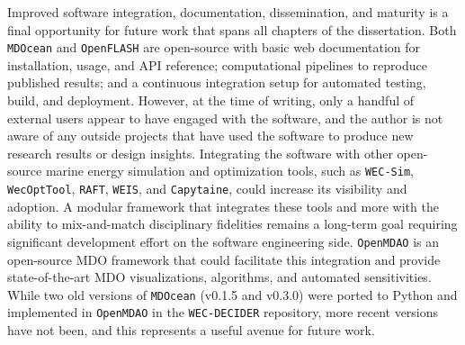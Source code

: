 Improved software integration, documentation, dissemination, and maturity is a final opportunity for future work that spans all chapters of the dissertation.
Both \texttt{MDOcean} and \texttt{OpenFLASH} are open-source with basic web documentation for installation, usage, and API reference;
computational pipelines to reproduce published results;
and a continuous integration setup for automated testing, build, and deployment.
However, at the time of writing, only a handful of external users appear to have engaged with the software,
and the author is not aware of any outside projects that have used the software to produce new research results or design insights.
Integrating the software with other open-source marine energy simulation and optimization tools,
such as \texttt{WEC-Sim}, \texttt{WecOptTool}, \texttt{RAFT}, \texttt{WEIS}, and \texttt{Capytaine},
could increase its visibility and adoption.
A modular framework that integrates these tools and more with the ability to mix-and-match disciplinary fidelities remains a long-term goal requiring significant development effort on the software engineering side.
\texttt{OpenMDAO} is an open-source MDO framework that could facilitate this integration and provide state-of-the-art MDO visualizations, algorithms, and automated sensitivities.
While two old versions of \texttt{MDOcean} (v0.1.5 and v0.3.0) were ported to Python and implemented in \texttt{OpenMDAO} in the \texttt{WEC-DECIDER} repository,
more recent versions have not been, and this represents a useful avenue for future work.


